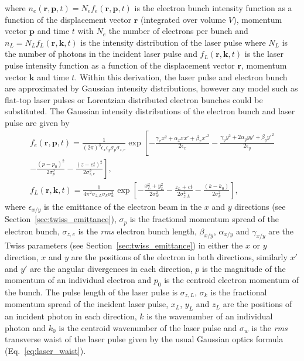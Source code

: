 \documentclass[../main.tex]{subfiles}
\begin{document}
where $n_{e}\left(\boldsymbol{r},\boldsymbol{p},t\right) = N_{e}f_{e}\left(\boldsymbol{r},\boldsymbol{p},t\right)$ is the  electron bunch intensity function as a function of the displacement vector $\boldsymbol{r}$ (integrated over volume $V$), momentum vector $\boldsymbol{p}$ and time $t$ with $N_{e}$ the number of electrons per bunch and $n_{L} = N_{L}f_{L}\left(\boldsymbol{r},\boldsymbol{k},t\right)$ is the intensity distribution of the laser pulse where $N_{L}$ is the number of photons in the incident laser pulse and $f_{L}\left(\boldsymbol{r},\boldsymbol{k},t\right)$ is the laser pulse intensity function as a function of the displacement vector $\boldsymbol{r}$, momentum vector $\boldsymbol{k}$ and time $t$. Within this derivation, the laser pulse and electron bunch are approximated by Gaussian intensity distributions, however any model such as flat-top laser pulses or Lorentzian distributed electron bunches could be substituted. The Gaussian intensity distributions of the electron bunch and laser pulse are given by \cite{sun2011theoretical}
\begin{gather} %
f_{e}\left(\boldsymbol{r},\boldsymbol{p},t\right) = \frac{1}{\left(2\pi\right)^{3}\epsilon_{x}\epsilon_{y}\sigma_{p}\sigma_{z,e}}\exp\left[-\frac{\gamma_{x}x^{2}+\alpha_{x}xx'+\beta_{x}x'^{2}}{2\epsilon_{x}}-\frac{\gamma_{y}y^{2}+2\alpha_{y}yy'+\beta_{y}y'^{2}}{2\epsilon_{y}}\right.\\\left.-\frac{\left(p-p_{0}\right)^{2}}{2\sigma_{p}^{2}}-\frac{\left(z-ct\right)^{2}}{2\sigma_{z,e}^{2}}\right], \nonumber
\label{eq:electron_gaussian_intensity_distribution} \\
f_{L}\left(\boldsymbol{r},\boldsymbol{k},t\right) = \frac{1}{4\pi^{2}\sigma_{z,L}\sigma_{k}\sigma_{w}^{2}}\exp\left[-\frac{x_{L}^{2}+y_{L}^{2}}{2\sigma_{w}^{2}}-\frac{z_{L}+ct}{2\sigma_{z,L}^{2}}-\frac{\left(k-k_{0}\right)}{2\sigma_{k}^{2}}\right],
\label{eq:laser_gaussian_intensity_distribution}
\end{gather}
where $\epsilon_{x/y}$ is the emittance of the electron beam in the $x$ and $y$ directions (see Section~\ref{sec:twiss_emittance}), $\sigma_{p}$ is the fractional momentum spread of the electron bunch, $\sigma_{z,e}$ is the \textit{rms} electron bunch length, $\beta_{x/y}$, $\alpha_{x/y}$ and $\gamma_{x/y}$ are the Twiss parameters (see Section~\ref{sec:twiss_emittance}) in either the $x$ or $y$ direction, $x$ and $y$ are the positions of the electron in both directions, similarly $x'$ and $y'$ are the angular divergences in each direction, $p$ is the magnitude of the momentum of an individual electron and $p_{0}$ is the centroid electron momentum of the bunch. The pulse length of the laser pulse is $\sigma_{z,L}$, $\sigma_{k}$ is the fractional momentum spread of the incident laser pulse, $x_{L}$, $y_{L}$ and $z_{L}$ are the positions of an incident photon in each direction, $k$ is the wavenumber of an individual photon and $k_{0}$ is the centroid wavenumber of the laser pulse and $\sigma_{w}$ is the \textit{rms} transverse waist of the laser pulse given by the usual Gaussian optics formula (Eq.~\ref{eq:laser_waist}).
\end{document}
